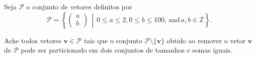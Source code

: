 Seja $\mathcal{P}$ o conjunto de vetores definitos por
\[\mathcal{P} = \left\{\begin{pmatrix} a \\ b \end{pmatrix} \, \middle\vert \, 0 \le a \le 2, 0 \le b \le 100, \, \text{and} \, a, b \in \mathbb{Z}\right\}.\]

Ache todos vetores $\mathbf{v} \in \mathcal{P}$ tais que o conjunto $\mathcal{P}\setminus\{\mathbf{v}\}$ obtido ao remover o vetor $\mathbf{v}$ de $\mathcal{P}$ pode ser particionado em dois conjuntos de tamanhos e somas iguais.
